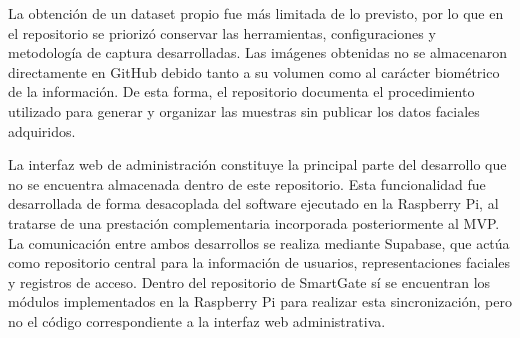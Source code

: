 La obtención de un dataset propio fue más limitada de lo previsto, por lo que en el repositorio se priorizó conservar las herramientas, configuraciones y metodología de captura desarrolladas. Las imágenes obtenidas no se almacenaron directamente en GitHub debido tanto a su volumen como al carácter biométrico de la información. De esta forma, el repositorio documenta el procedimiento utilizado para generar y organizar las muestras sin publicar los datos faciales adquiridos.

La interfaz web de administración constituye la principal parte del desarrollo que no se encuentra almacenada dentro de este repositorio. Esta funcionalidad fue desarrollada de forma desacoplada del software ejecutado en la Raspberry Pi, al tratarse de una prestación complementaria incorporada posteriormente al MVP. La comunicación entre ambos desarrollos se realiza mediante Supabase, que actúa como repositorio central para la información de usuarios, representaciones faciales y registros de acceso. Dentro del repositorio de SmartGate sí se encuentran los módulos implementados en la Raspberry Pi para realizar esta sincronización, pero no el código correspondiente a la interfaz web administrativa.
